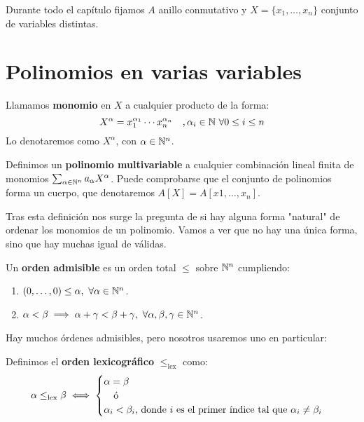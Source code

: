 
Durante todo el capítulo fijamos $A$ anillo conmutativo y $X=\{x_1, \dots, x_n\}$ conjunto de variables distintas.

\section{Polinomios en varias variables}

\begin{definicion}
  Llamamos \textbf{monomio} en $X$ a cualquier producto de la forma:
  $$X^{\alpha} = x_1^{\alpha_1} \cdots x_n^{\alpha_n}\quad, \alpha_i \in \mathbb{N}\ \forall 0\le i \le n$$
  Lo denotaremos como $X^{\alpha}$, con $\alpha\in \mathbb{N}^n$.
\end{definicion}

\begin{definicion}
  Definimos un \textbf{polinomio multivariable} a cualquier combinación lineal finita de monomios $\sum_{\alpha\in\mathbb{N}^n} a_{\alpha} X^{\alpha}$. Puede comprobarse que el conjunto de polinomios forma un cuerpo, que denotaremos $A[X] = A[x1,\dots, x_n]$.
\end{definicion}

Tras esta definición nos surge la pregunta de si hay alguna forma "natural" de ordenar los monomios de un polinomio. Vamos a ver que no hay una única forma, sino que hay muchas igual de válidas.

\begin{definicion}
  Un \textbf{orden admisible} es un orden total $\le$ sobre $\mathbb{N}^n$ cumpliendo:
  \begin{enumerate}
    \item $(0,\dots ,0) \le \alpha,\ \forall \alpha \in \mathbb{N}^n$.
    \item $\alpha < \beta \implies \alpha + \gamma < \beta + \gamma,\ \forall \alpha,\beta,\gamma \in \mathbb{N}^n$.
  \end{enumerate}
\end{definicion}

Hay muchos órdenes admisibles, pero nosotros usaremos uno en particular:

\begin{definicion}
  Definimos el \textbf{orden lexicográfico} $\le_{\text{lex}}$ como:
  \begin{equation*}
    \alpha \le_{\text{lex}} \beta \iff \begin{cases}
      \alpha  = \beta \\
      \quad\text{ó}   \\
      \alpha_i < \beta_i \text{, donde $i$ es el primer índice tal que } \alpha_i \neq \beta_i
    \end{cases}
  \end{equation*}
\end{definicion}

